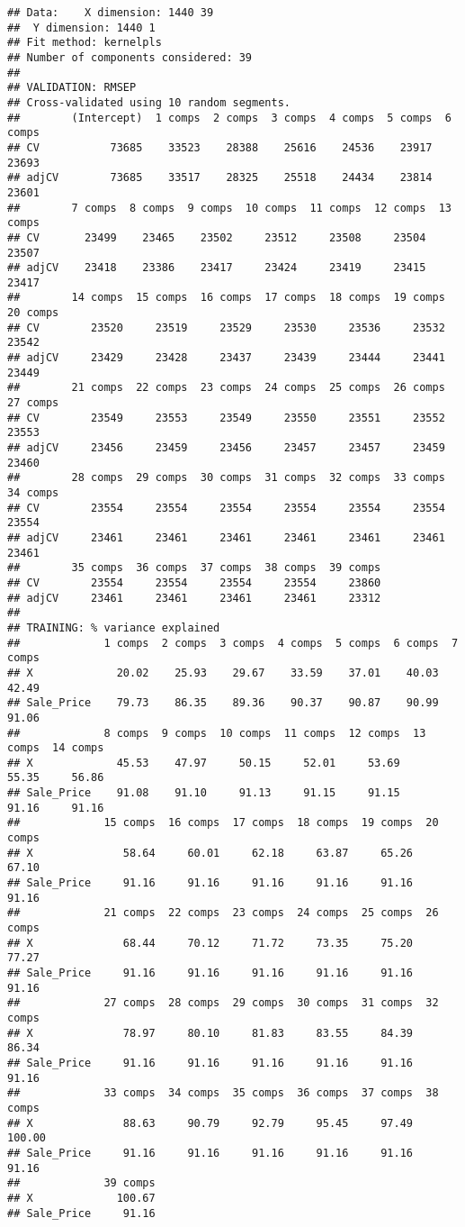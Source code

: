 \documentclass[
]{article}
\begin{document}
\begin{verbatim}
## Data:    X dimension: 1440 39 
##  Y dimension: 1440 1
## Fit method: kernelpls
## Number of components considered: 39
## 
## VALIDATION: RMSEP
## Cross-validated using 10 random segments.
##        (Intercept)  1 comps  2 comps  3 comps  4 comps  5 comps  6 comps
## CV           73685    33523    28388    25616    24536    23917    23693
## adjCV        73685    33517    28325    25518    24434    23814    23601
##        7 comps  8 comps  9 comps  10 comps  11 comps  12 comps  13 comps
## CV       23499    23465    23502     23512     23508     23504     23507
## adjCV    23418    23386    23417     23424     23419     23415     23417
##        14 comps  15 comps  16 comps  17 comps  18 comps  19 comps  20 comps
## CV        23520     23519     23529     23530     23536     23532     23542
## adjCV     23429     23428     23437     23439     23444     23441     23449
##        21 comps  22 comps  23 comps  24 comps  25 comps  26 comps  27 comps
## CV        23549     23553     23549     23550     23551     23552     23553
## adjCV     23456     23459     23456     23457     23457     23459     23460
##        28 comps  29 comps  30 comps  31 comps  32 comps  33 comps  34 comps
## CV        23554     23554     23554     23554     23554     23554     23554
## adjCV     23461     23461     23461     23461     23461     23461     23461
##        35 comps  36 comps  37 comps  38 comps  39 comps
## CV        23554     23554     23554     23554     23860
## adjCV     23461     23461     23461     23461     23312
## 
## TRAINING: % variance explained
##             1 comps  2 comps  3 comps  4 comps  5 comps  6 comps  7 comps
## X             20.02    25.93    29.67    33.59    37.01    40.03    42.49
## Sale_Price    79.73    86.35    89.36    90.37    90.87    90.99    91.06
##             8 comps  9 comps  10 comps  11 comps  12 comps  13 comps  14 comps
## X             45.53    47.97     50.15     52.01     53.69     55.35     56.86
## Sale_Price    91.08    91.10     91.13     91.15     91.15     91.16     91.16
##             15 comps  16 comps  17 comps  18 comps  19 comps  20 comps
## X              58.64     60.01     62.18     63.87     65.26     67.10
## Sale_Price     91.16     91.16     91.16     91.16     91.16     91.16
##             21 comps  22 comps  23 comps  24 comps  25 comps  26 comps
## X              68.44     70.12     71.72     73.35     75.20     77.27
## Sale_Price     91.16     91.16     91.16     91.16     91.16     91.16
##             27 comps  28 comps  29 comps  30 comps  31 comps  32 comps
## X              78.97     80.10     81.83     83.55     84.39     86.34
## Sale_Price     91.16     91.16     91.16     91.16     91.16     91.16
##             33 comps  34 comps  35 comps  36 comps  37 comps  38 comps
## X              88.63     90.79     92.79     95.45     97.49    100.00
## Sale_Price     91.16     91.16     91.16     91.16     91.16     91.16
##             39 comps
## X             100.67
## Sale_Price     91.16
\end{verbatim}
\end{document}
